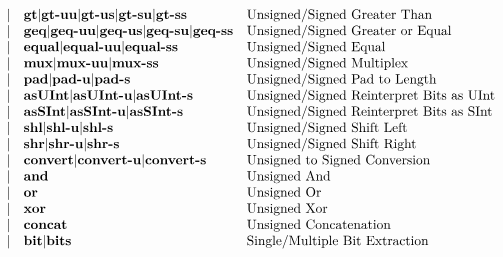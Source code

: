 \documentclass[12pt]{article}
\begin{document}
\[\begin{array}{rll}
\vert           &\text{\bf gt}          \vert \text{\bf gt-uu}       \vert \text{\bf gt-us}       \vert \text{\bf gt-su}    \vert \text{\bf gt-ss}      &\text{Unsigned/Signed Greater Than}\\
\vert           &\text{\bf geq}         \vert \text{\bf geq-uu}      \vert \text{\bf geq-us}      \vert \text{\bf geq-su}   \vert \text{\bf geq-ss}     &\text{Unsigned/Signed Greater or Equal}\\
\vert           &\text{\bf equal}       \vert \text{\bf equal-uu}    \vert \text{\bf equal-ss}                                                &\text{Unsigned/Signed Equal}\\
\vert           &\text{\bf mux}         \vert \text{\bf mux-uu}      \vert \text{\bf mux-ss}                                                  &\text{Unsigned/Signed Multiplex}\\
\vert           &\text{\bf pad}         \vert \text{\bf pad-u}       \vert \text{\bf pad-s}                                                   &\text{Unsigned/Signed Pad to Length}\\
\vert           &\text{\bf asUInt}      \vert \text{\bf asUInt-u}    \vert \text{\bf asUInt-s}                                                &\text{Unsigned/Signed Reinterpret Bits as UInt}\\
\vert           &\text{\bf asSInt}      \vert \text{\bf asSInt-u}    \vert \text{\bf asSInt-s}                                                &\text{Unsigned/Signed Reinterpret Bits as SInt}\\
\vert           &\text{\bf shl}         \vert \text{\bf shl-u}       \vert \text{\bf shl-s}                                                   &\text{Unsigned/Signed Shift Left}\\
\vert           &\text{\bf shr}         \vert \text{\bf shr-u}       \vert \text{\bf shr-s}                                                   &\text{Unsigned/Signed Shift Right}\\
\vert           &\text{\bf convert}     \vert \text{\bf convert-u}   \vert \text{\bf convert-s}                                               &\text{Unsigned to Signed Conversion}\\
\vert           &\text{\bf and}                                                                                                     &\text{Unsigned And}\\
\vert           &\text{\bf or}                                                                                                      &\text{Unsigned Or}\\
\vert           &\text{\bf xor}                                                                                                     &\text{Unsigned Xor}\\
\vert           &\text{\bf concat}                                                                                                  &\text{Unsigned Concatenation}\\
\vert           &\text{\bf bit}         \vert \text{\bf bits}                                                                            &\text{Single/Multiple Bit Extraction}\\
\end{array}
\]
\end{document}

